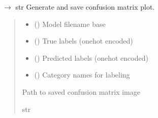 \documentclass[letterpaper,10pt,english]{sphinxmanual}
\begin{document}
\begin{fulllineitems}
\label{\detokenize{autoapi/src/RandomForestTrainer/index:src.RandomForestTrainer.plot_confusion_matrix}}
\pysigstartsignatures
\pysiglinewithargsret
{}
{\sphinxparamcomma {}\sphinxparamcomma {}\sphinxparamcomma {}}
{{ $\rightarrow$ str}}
\pysigstopsignatures
\sphinxAtStartPar
Generate and save confusion matrix plot.
\begin{quote}\begin{description}
\begin{itemize}
\item {} 
\sphinxAtStartPar
{} () \textendash{} Model filename base

\item {} 
\sphinxAtStartPar
{} () \textendash{} True labels (one\sphinxhyphen{}hot encoded)

\item {} 
\sphinxAtStartPar
{} () \textendash{} Predicted labels (one\sphinxhyphen{}hot encoded)

\item {} 
\sphinxAtStartPar
{} (\sphinxstyleliteralemphasis{\sphinxupquote{{[}}}\sphinxstyleliteralemphasis{\sphinxupquote{{]}}}) \textendash{} Category names for labeling

\end{itemize}

\sphinxAtStartPar
Path to saved confusion matrix image

\sphinxAtStartPar
str

\end{description}\end{quote}

\end{fulllineitems}
\end{document}
